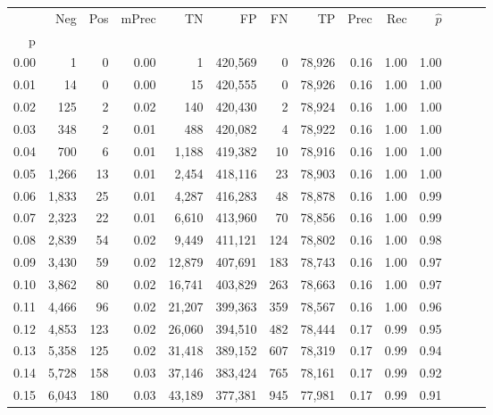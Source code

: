 \begin{tabular}{rrrrrrrrrrrrrr}
\toprule
{} &    Neg &    Pos & mPrec &       TN &       FP &      FN &      TP &  Prec &   Rec & $\hat{p}$ \\
p    &        &        &       &          &          &         &         &       &       &           \\
\midrule
0.00 &      1 &      0 &  0.00 &        1 &  420,569 &       0 &  78,926 &  0.16 &  1.00 &      1.00 \\
0.01 &     14 &      0 &  0.00 &       15 &  420,555 &       0 &  78,926 &  0.16 &  1.00 &      1.00 \\
0.02 &    125 &      2 &  0.02 &      140 &  420,430 &       2 &  78,924 &  0.16 &  1.00 &      1.00 \\
0.03 &    348 &      2 &  0.01 &      488 &  420,082 &       4 &  78,922 &  0.16 &  1.00 &      1.00 \\
0.04 &    700 &      6 &  0.01 &    1,188 &  419,382 &      10 &  78,916 &  0.16 &  1.00 &      1.00 \\
0.05 &  1,266 &     13 &  0.01 &    2,454 &  418,116 &      23 &  78,903 &  0.16 &  1.00 &      1.00 \\
0.06 &  1,833 &     25 &  0.01 &    4,287 &  416,283 &      48 &  78,878 &  0.16 &  1.00 &      0.99 \\
0.07 &  2,323 &     22 &  0.01 &    6,610 &  413,960 &      70 &  78,856 &  0.16 &  1.00 &      0.99 \\
0.08 &  2,839 &     54 &  0.02 &    9,449 &  411,121 &     124 &  78,802 &  0.16 &  1.00 &      0.98 \\
0.09 &  3,430 &     59 &  0.02 &   12,879 &  407,691 &     183 &  78,743 &  0.16 &  1.00 &      0.97 \\
0.10 &  3,862 &     80 &  0.02 &   16,741 &  403,829 &     263 &  78,663 &  0.16 &  1.00 &      0.97 \\
0.11 &  4,466 &     96 &  0.02 &   21,207 &  399,363 &     359 &  78,567 &  0.16 &  1.00 &      0.96 \\
0.12 &  4,853 &    123 &  0.02 &   26,060 &  394,510 &     482 &  78,444 &  0.17 &  0.99 &      0.95 \\
0.13 &  5,358 &    125 &  0.02 &   31,418 &  389,152 &     607 &  78,319 &  0.17 &  0.99 &      0.94 \\
0.14 &  5,728 &    158 &  0.03 &   37,146 &  383,424 &     765 &  78,161 &  0.17 &  0.99 &      0.92 \\
0.15 &  6,043 &    180 &  0.03 &   43,189 &  377,381 &     945 &  77,981 &  0.17 &  0.99 &      0.91 \\

\end{tabular}
